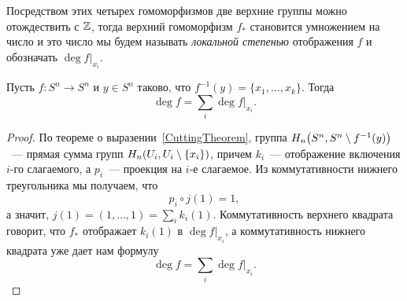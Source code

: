     Посредством этих четырех гомоморфизмов две верхние группы можно отождествить с $\mathbb{Z}$, тогда верхний
    гомоморфизм $f_{*}$ становится умножением на число и это число мы будем называть \emph{локальной степенью} отображения $f$
    и обозначать $\deg{f\vert_{x_i}}$.


    \begin{theorem}
        Пусть $f\colon S^n \to S^n$ и $y \in S^n$ таково, что $f^{-1}(y) = \{ x_1, \ldots, x_k \}$. Тогда
        \[ \deg{f} = \sum_{i} \deg{f}\vert_{x_i}.\]
    \end{theorem}
    \begin{proof}
        По теореме о выразении~\ref{CuttingTheorem}, группа $H_{n}\lr*{S^n, S^n \setminus f^{-1}(y)}$~--- прямая сумма групп
        $H_{n}\lr*{U_i, U_i \setminus \{ x_i \}}$,  причем $k_i$~--- отображение включения $i$-го слагаемого, а $p_i$~--- проекция на $i$-е слагаемое.
        Из коммутативности нижнего треугольника мы получаем, что
        \[ p_i \circ j (1) = 1, \]
        а значит, $j(1) = (1, \ldots, 1) = \sum_{i} k_i(1)$. Коммутативность верхнего квадрата говорит, что $f_*$ отображает $k_i(1)$ в $\deg{f\vert_{x_i}}$,
        а коммутативность нижнего квадрата уже дает нам формулу
        \[ \deg{f} = \sum_{i} \deg{f\vert_{x_i}}. \]
    \end{proof}